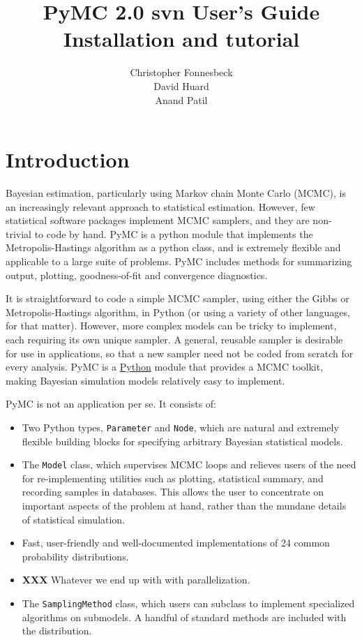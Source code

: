 \documentclass[]{book}
\title{PyMC 2.0 svn User's Guide \\
Installation and tutorial}
\author{ Christopher Fonnesbeck\\ David Huard \\ Anand Patil }
\date
\begin{document}
\ifpdf
{}
\else
{}
\fi

\maketitle

\tableofcontents

\chapter{Introduction} %

Bayesian estimation, particularly using Markov chain Monte Carlo (MCMC), is an increasingly relevant approach to statistical estimation. However, few statistical software packages implement MCMC samplers, and they are non-trivial to code by hand. PyMC is a python module that implements the Metropolis-Hastings algorithm as a python class, and is extremely flexible and applicable to a large suite of problems. PyMC includes methods for summarizing output, plotting, goodness-of-fit and convergence diagnostics.

It is straightforward to code a simple MCMC sampler, using either the Gibbs or Metropolis-Hastings algorithm, in Python (or using a variety of other languages, for that matter). However, more complex models can be tricky to implement, each requiring its own unique sampler. A general, reusable sampler is desirable for use in applications, so that a new sampler need not be coded from scratch for every analysis. PyMC is a \href{http://python.org}{Python} module that provides a MCMC toolkit, making Bayesian simulation models relatively easy to implement.

\bigskip
PyMC is not an application per se. It consists of:
\begin{itemize}
    \item Two Python types, \texttt{Parameter} and \texttt{Node}, which are natural and extremely flexible building blocks for specifying arbitrary Bayesian statistical models.
    \item The \texttt{Model} class, which supervises MCMC loops and relieves users of the need for re-implementing utilities such as plotting, statistical summary, and recording samples in databases. This allows the user to concentrate on important aspects of the problem at hand, rather than the mundane details of statistical simulation.
    \item Fast, user-friendly and well-documented implementations of 24 common probability distributions.
    \item \textbf{XXX} Whatever we end up with with parallelization.
    \item The \texttt{SamplingMethod} class, which users can subclass to implement specialized algorithms on submodels. A handful of standard methods are included with the distribution.
\end{itemize}
\end{document}
